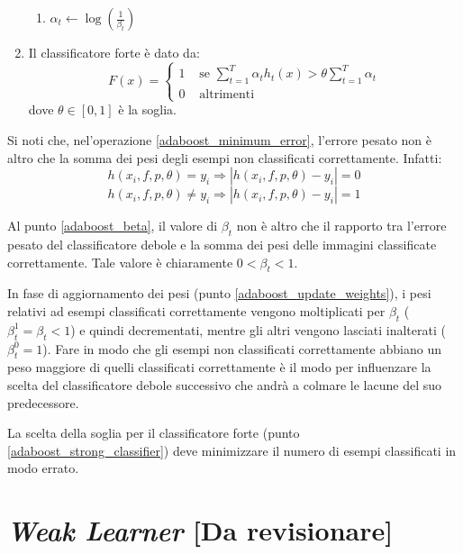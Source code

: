 \begin{enumerate}
\begin{enumerate}
                    \item $\alpha_t \leftarrow \log(\frac{1}{\beta_t})$
                \end{enumerate}

                \item \label{adaboost_strong_classifier} Il classificatore forte è dato da:
                \begin{equation}\label{eq:strong_classifier}
                    F(x) = 
                    \begin{cases}
                        1 & \text{ se } \sum_{t = 1}^{T} \alpha_t h_t(x) > \theta \sum_{t = 1}^{T} \alpha_t \\
                        0 & \text{ altrimenti }
                    \end{cases}
                \end{equation}
                dove $\theta \in [0,1]$ è la soglia.
            \end{enumerate}

            Si noti che, nel'operazione \ref{adaboost_minimum_error}, l'errore pesato non è altro che la somma dei pesi degli esempi non classificati correttamente. Infatti:
            $$ h(x_i, f, p, \theta) = y_i \Rightarrow |h(x_i, f, p, \theta) - y_i| = 0 $$
            $$ h(x_i, f, p, \theta) \neq y_i \Rightarrow |h(x_i, f, p, \theta) - y_i| = 1 $$

            Al punto \ref{adaboost_beta}, il valore di $\beta_t$ non è altro che il rapporto tra l'errore pesato del classificatore debole e la somma dei pesi delle immagini classificate correttamente. Tale valore è chiaramente $0 < \beta_t < 1$.

            In fase di aggiornamento dei pesi (punto \ref{adaboost_update_weights}), i pesi relativi ad esempi classificati correttamente vengono moltiplicati per $\beta_t$ ($\beta_{t}^{1} = \beta_t < 1$) e quindi decrementati, mentre gli altri vengono lasciati inalterati ($\beta_{t}^{0} = 1$). Fare in modo che gli esempi non classificati correttamente abbiano un peso maggiore di quelli classificati correttamente è il modo per influenzare la scelta del classificatore debole successivo che andrà a colmare le lacune del suo predecessore.

            La scelta della soglia per il classificatore forte (punto \ref{adaboost_strong_classifier}) deve minimizzare il numero di esempi classificati in modo errato.
    
    \section{\emph{Weak Learner} [Da revisionare]}
    \label{sec:weak_learner}
